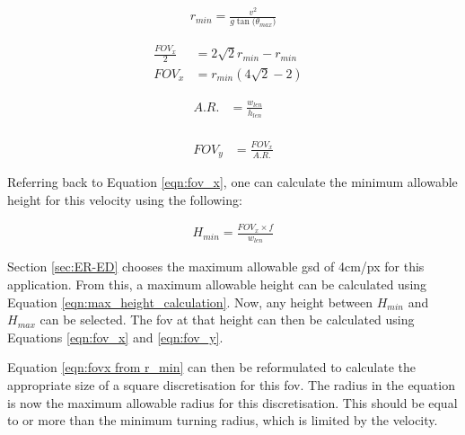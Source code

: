 \begin{equation}
	\label{eqn:r_min}
	\begin{aligned}
		r_{min} = \frac{v^2}{g\tan{(\theta_{max}})}
	\end{aligned}
\end{equation}

\begin{equation}
	\label{eqn:fovx from r_min}
	\begin{aligned}
		\frac{FOV_x}{2} &= 2\sqrt{2}r_{min}-r_{min} &\\
		FOV_x &= r_{min}(4\sqrt{2}-2) &
	\end{aligned}
\end{equation}

\begin{equation}
	\label{eqn:AR}
	\begin{aligned}
		A.R. &= \frac{w_{len}}{h_{len}} &\\
	\end{aligned}
\end{equation}

\begin{equation}
	\label{eqn:fovy from fovx}
	\begin{aligned}
		FOV_y &= \frac{FOV_x}{A.R.}
	\end{aligned}
\end{equation}

\noindent Referring back to Equation \ref{eqn:fov_x}, one can calculate the minimum allowable height for this velocity using the following: 

\begin{equation}
	\label{eqn:H_min}
	\begin{aligned}
		H_{min} = \frac{FOV_x \times f}{w_{len}}
	\end{aligned}
\end{equation}

\noindent Section \ref{sec:ER-ED} chooses the maximum allowable \ac{gsd} of 4cm/px for this application. From this, a maximum allowable height can be calculated using Equation \ref{eqn:max_height_calculation}. Now, any height between $H_{min}$ and $H_{max}$ can be selected. The \ac{fov} at that height can then be calculated using Equations \ref{eqn:fov_x} and \ref{eqn:fov_y}. 

Equation \ref{eqn:fovx from r_min} can then be reformulated to calculate the appropriate size of a square discretisation for this \ac{fov}. The radius in the equation is now the maximum allowable radius for this discretisation. This should be equal to or more than the minimum turning radius, which is limited by the velocity.

